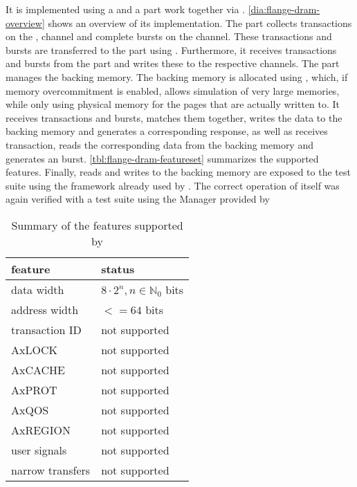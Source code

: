 It is implemented using a \systemverilog{} and a \cpp{} part work together via \DPI{}. \autoref{dia:flange-dram-overview} shows an overview of its implementation. The \systemverilog{} part collects transactions on the \AW{}, \AR{} \AXI{} channel and complete bursts on the \W{} \AXI{} channel. These transactions and bursts are transferred to the \cpp{} part using \DPI{}. Furthermore, it receives \B{} transactions and \R{} bursts from the \cpp{} part and writes these to the respective \AXI{} channels.
The \cpp{} part manages the backing memory. The backing memory is allocated using \mmap{}, which, if memory overcommitment is enabled, allows simulation of very large memories, while only using physical memory for the pages that are actually written to. It receives \AW{} transactions and \W{} bursts, matches them together, writes the data to the backing memory and generates a corresponding \B{} response, as well as receives \AR{} transaction, reads the corresponding data from the backing memory and generates an \R{} burst. \autoref{tbl:flange-dram-featureset} summarizes the supported \AXI{} features. Finally, reads and writes to the backing memory are exposed to the test suite using the \RCF{} framework already used by \flange{}.
The correct operation of \flangedram{} itself was again verified with a test suite using the \AXI{} Manager provided by \cocotb{}

\begin{table}
  \begin{center}
\begin{tabular}{ll}
  \toprule
  feature & status \\
  \midrule
  data width & $8 · 2^{n}, n ∈ ℕ_{0}$ bits \\
  address width & $<= 64$ bits \\
  transaction ID & not supported \\
  AxLOCK & not supported \\
  AxCACHE & not supported \\
  AxPROT & not supported \\
  AxQOS & not supported \\
  AxREGION & not supported \\
  user signals & not supported \\
  narrow transfers & not supported \\
  \bottomrule
\end{tabular}
  \end{center}
\caption{Summary of the \AXI{} features supported by \flangedram}\label{tbl:flange-dram-featureset}
\end{table}

